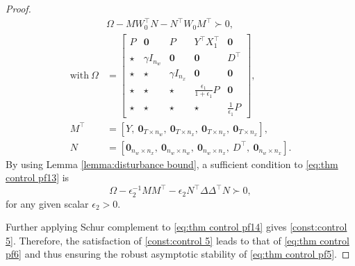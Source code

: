 \documentclass[letterpaper, 10 pt, conference]{ieeeconf}
\begin{document}
\begin{proof}
\begin{align}
			& \Omega -  M W_0^\top N - N^\top W_0 M^\top \succ 0, \\
			\text{with}~\Omega &= 
			\begin{bmatrix}
				P  & \mathbf{0} & P & Y^\top X_1^\top  & \mathbf{0}\\
				\star & \gamma I_{n_w} & \mathbf{0} & \mathbf{0} & D^\top  \\
				\star & \star & \gamma I_{n_x} & \mathbf{0} & \mathbf{0}\\
				\star & \star & \star & \frac{\epsilon_1}{1 + \epsilon_1} P & \mathbf{0} \\
				\star & \star & \star & \star & \frac{1}{\epsilon_1} P
			\end{bmatrix}, \nonumber\\
			M^\top &= \left[ 
			Y, ~\mathbf{0}_{T \times n_w}, ~\mathbf{0}_{T \times n_x}, ~\mathbf{0}_{T \times n_x}, ~\mathbf{0}_{T \times n_x}
			\right], \nonumber\\
			N &= \left[ 
			\mathbf{0}_{n_w \times n_x}, ~\mathbf{0}_{n_w \times n_w}, ~\mathbf{0}_{n_w \times n_x}, ~D^\top, ~\mathbf{0}_{n_w \times n_x}
			\right]. \nonumber
		\end{align}
By using Lemma \ref{lemma:disturbance bound}, 
a sufficient condition to \eqref{eq:thm control pf13} is 
		\begin{equation}\label{eq:thm control pf14}
			\Omega - \epsilon_2^{-1} M M^\top - \epsilon_2 N^\top \Delta \Delta^\top N \succ 0,
		\end{equation}
for any given scalar $\epsilon_2 > 0$.		

Further applying Schur complement to \eqref{eq:thm control pf14} gives \eqref{const:control 5}. Therefore, the satisfaction of \eqref{const:control 5} leads to that of \eqref{eq:thm control pf6} and thus ensuring the robust asymptotic stability of \eqref{eq:thm control pf5}.
\end{proof}	
	
\end{document}
